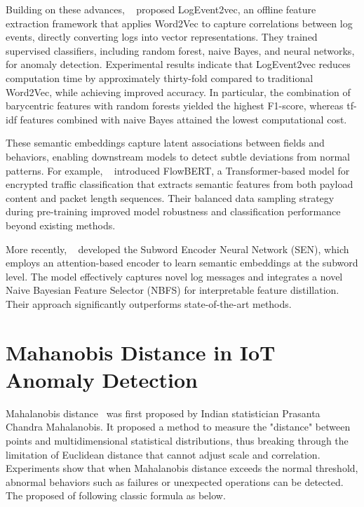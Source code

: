 \begin{ZhChapter}
    Building on these advances, \citeauthor{wang2020logevent2vec}~\cite{wang2020logevent2vec} proposed LogEvent2vec, an offline feature extraction framework that applies Word2Vec to capture correlations between log events, directly converting logs into vector representations. They trained supervised classifiers, including random forest, naive Bayes, and neural networks, for anomaly detection. Experimental results indicate that LogEvent2vec reduces computation time by approximately thirty-fold compared to traditional Word2Vec, while achieving improved accuracy. In particular, the combination of barycentric features with random forests yielded the highest F1-score, whereas tf-idf features combined with naive Bayes attained the lowest computational cost.

    These semantic embeddings capture latent associations between fields and behaviors, enabling downstream models to detect subtle deviations from normal patterns. For example, \citeauthor{pan2023flowbert}~\cite{pan2023flowbert} introduced FlowBERT, a Transformer-based model for encrypted traffic classification that extracts semantic features from both payload content and packet length sequences. Their balanced data sampling strategy during pre-training improved model robustness and classification performance beyond existing methods.



    More recently, \citeauthor{hariharan2023detecting}~\cite{hariharan2023detecting} developed the Subword Encoder Neural Network (SEN), which employs an attention-based encoder to learn semantic embeddings at the subword level. The model effectively captures novel log messages and integrates a novel Naive Bayesian Feature Selector (NBFS) for interpretable feature distillation. Their approach significantly outperforms state-of-the-art methods.


    \section{Mahanobis Distance in IoT Anomaly Detection}
    Mahalanobis distance~\cite{de2000mahalanobis} was first proposed by Indian statistician Prasanta Chandra Mahalanobis. It proposed a method to measure the "distance" between points and multidimensional statistical distributions, thus breaking through the limitation of Euclidean distance that cannot adjust scale and correlation.
    Experiments show that when Mahalanobis distance exceeds the normal threshold, abnormal behaviors such as failures or unexpected operations can be detected. The proposed of following classic formula as below.



\end{ZhChapter}
